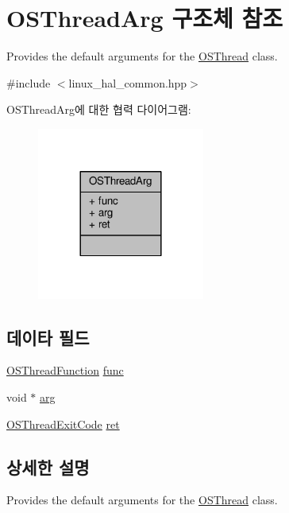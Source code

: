 \hypertarget{struct_o_s_thread_arg}{}\section{O\+S\+Thread\+Arg 구조체 참조}
\label{struct_o_s_thread_arg}


Provides the default arguments for the \hyperlink{class_o_s_thread}{O\+S\+Thread} class.  




{\ttfamily \#include $<$linux\+\_\+hal\+\_\+common.\+hpp$>$}



O\+S\+Thread\+Arg에 대한 협력 다이어그램\+:
\nopagebreak
\begin{figure}[H]
\begin{center}
\leavevmode
\includegraphics[width=156pt]{struct_o_s_thread_arg__coll__graph}
\end{center}
\end{figure}
\subsection*{데이타 필드}
\begin{DoxyCompactItemize}
\item 
\hyperlink{avbts__osthread_8hpp_a68966f4aba46c269e8341073e7787d34}{O\+S\+Thread\+Function} \hyperlink{struct_o_s_thread_arg_a8eac03f92af0136b0d3570a5fd522d0b}{func}
\item 
void $\ast$ \hyperlink{struct_o_s_thread_arg_ae036856e415526e58e249638733f6752}{arg}
\item 
\hyperlink{avbts__osthread_8hpp_a82108124541f8ae837064a49057d2f82}{O\+S\+Thread\+Exit\+Code} \hyperlink{struct_o_s_thread_arg_a30d995ac745fe161ad76f8bb0dacad37}{ret}
\end{DoxyCompactItemize}


\subsection{상세한 설명}
Provides the default arguments for the \hyperlink{class_o_s_thread}{O\+S\+Thread} class. 

